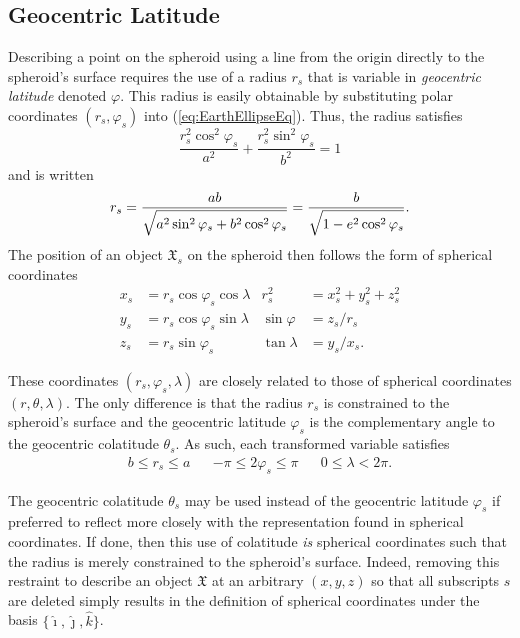 \documentclass[11pt,dvipsnames]{thesis}
\begin{document}
\subsection{Geocentric Latitude}
Describing a point on the spheroid using a line from the origin directly to the spheroid's surface requires the use of a radius $r_s$ that is variable in \textit{geocentric latitude} denoted $\varphi$. This radius is easily obtainable by substituting polar coordinates $(r_s, \varphi_s)$ into (\ref{eq:EarthEllipseEq}). Thus, the radius satisfies
\begin{equation}
\frac{r_s^2\cos^2\varphi_s}{a^2} + \frac{r_s^2\sin^2\varphi_s}{b^2} = 1 \label{eq:spheroidPolar}
\end{equation}
and is written
\begin{equation}
r_s = \frac{ab}{\sqrt{\vphantom{\cosphantom^2} a^2\,\smash{\sin}^2\,\varphi_s + b^2\cos^2\varphi_s}} = \frac{b}{\sqrt{\vphantom{\cosphantom^2} 1-e^2\cos^2\varphi_s}}. \label{eq:geocentricRadius}
\end{equation}
The position of an object $\mathfrak{X}_s$ on the spheroid then follows the form of spherical coordinates
\begin{align}
x_s &= r_s \cos\varphi_s \cos\lambda & r_s^2 &= x_s^2 + y_s^2 + z_s^2 \\
y_s &= r_s \cos\varphi_s \sin\lambda & \sin\varphi &= z_s / r_s \\
z_s &= r_s \sin\varphi_s & \tan\lambda &= y_s / x_s.
\end{align}

These coordinates $(r_s, \varphi_s, \lambda)$ are closely related to those of spherical coordinates $(r, \theta, \lambda)$. The only difference is that the radius $r_{\!s}$ is constrained to the spheroid's surface and the geocentric latitude $\varphi_s$ is the complementary angle to the geocentric colatitude $\theta_s$. As such, each transformed variable satisfies
\begin{align}
b \leqslant r_s \leqslant a && -\pi \leqslant 2\varphi_s \leqslant \pi && 0 \leqslant \lambda < 2\pi.
\end{align}


The geocentric colatitude $\theta_s$ may be used instead of the geocentric latitude $\varphi_s$ if preferred to reflect more closely with the representation found in spherical coordinates. If done, then this use of colatitude \textit{is} spherical coordinates such that the radius is merely constrained to the spheroid's surface. Indeed, removing this restraint to describe an object $\mathfrak{X}$ at an arbitrary $(x, y, z)$ so that all subscripts $s$ are deleted simply results in the definition of spherical coordinates under the basis $\{\hat{\imath}, \hat{\jmath}, \hat{k}\}$.
\end{document}

